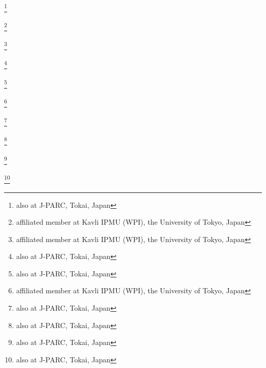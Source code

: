 \documentclass[%
 reprint,
superscriptaddress,
 amsmath,amssymb,
 aps,
]{revtex4-1}
\begin{document}
\author{T.\,Kutter}\INSTFI
\author{J.\,Lagoda}\INSTDF
\author{I.\,Lamont}\INSTEJ
\author{E.\,Larkin}\INSTFD
\author{M.\,Laveder}\INSTBF
\author{M.\,Lawe}\INSTEJ
\author{M.\,Lazos}\INSTFC
\author{T.\,Lindner}\INSTB
\author{C.\,Lister}\INSTFD
\author{R.P.\,Litchfield}\INSTFD
\author{A.\,Longhin}\INSTBF
\author{J.P.\,Lopez}\INSTGB
\author{L.\,Ludovici}\INSTBD
\author{L.\,Magaletti}\INSTGF
\author{K.\,Mahn}\INSTHB
\author{M.\,Malek}\INSTEI
\author{S.\,Manly}\INSTGD
\author{A.D.\,Marino}\INSTGB
\author{J.\,Marteau}\INSTJ
\author{J.F.\,Martin}\INSTF
\author{P.\,Martins}\INSTFA
\author{S.\,Martynenko}\INSTEB
\author{T.\,Maruyama}\thanks{also at J-PARC, Tokai, Japan}\INSTCB
\author{V.\,Matveev}\INSTEB
\author{K.\,Mavrokoridis}\INSTFC
\author{E.\,Mazzucato}\INSTI
\author{M.\,McCarthy}\INSTH
\author{N.\,McCauley}\INSTFC
\author{K.S.\,McFarland}\INSTGD
\author{C.\,McGrew}\INSTFJ
\author{A.\,Mefodiev}\INSTEB
\author{C.\,Metelko}\INSTFC
\author{M.\,Mezzetto}\INSTBF
\author{P.\,Mijakowski}\INSTDF
\author{C.A.\,Miller}\INSTB
\author{A.\,Minamino}\INSTCD
\author{O.\,Mineev}\INSTEB
\author{A.\,Missert}\INSTGB
\author{M.\,Miura}\thanks{affiliated member at Kavli IPMU (WPI), the University of Tokyo, Japan}\INSTBJ
\author{S.\,Moriyama}\thanks{affiliated member at Kavli IPMU (WPI), the University of Tokyo, Japan}\INSTBJ
\author{Th.A.\,Mueller}\INSTBA
\author{A.\,Murakami}\INSTCD
\author{M.\,Murdoch}\INSTFC
\author{S.\,Murphy}\INSTEF
\author{J.\,Myslik}\INSTG
\author{T.\,Nakadaira}\thanks{also at J-PARC, Tokai, Japan}\INSTCB
\author{M.\,Nakahata}\INSTBJ\INSTHA
\author{K.G.\,Nakamura}\INSTCD
\author{K.\,Nakamura}\thanks{also at J-PARC, Tokai, Japan}\INSTHA\INSTCB
\author{S.\,Nakayama}\thanks{affiliated member at Kavli IPMU (WPI), the University of Tokyo, Japan}\INSTBJ
\author{T.\,Nakaya}\INSTCD\INSTHA
\author{K.\,Nakayoshi}\thanks{also at J-PARC, Tokai, Japan}\INSTCB
\author{C.\,Nantais}\INSTD
\author{C.\,Nielsen}\INSTD
\author{M.\,Nirkko}\INSTEE
\author{K.\,Nishikawa}\thanks{also at J-PARC, Tokai, Japan}\INSTCB
\author{Y.\,Nishimura}\INSTCG
\author{J.\,Nowak}\INSTEJ
\author{H.M.\,O'Keeffe}\INSTEJ
\author{R.\,Ohta}\thanks{also at J-PARC, Tokai, Japan}\INSTCB
\author{K.\,Okumura}\INSTCG\INSTHA
\author{T.\,Okusawa}\INSTCF
\author{W.\,Oryszczak}\INSTDJ
\author{S.M.\,Oser}\INSTD
\author{T.\,Ovsyannikova}\INSTEB
\author{R.A.\,Owen}\INSTFA
\author{Y.\,Oyama}\thanks{also at J-PARC, Tokai, Japan}\INSTCB
\author{V.\,Palladino}\INSTBE
\author{J.L.\,Palomino}\INSTFJ
\author{V.\,Paolone}\INSTGC
\author{D.\,Payne}\INSTFC
\author{O.\,Perevozchikov}\INSTFI
\author{J.D.\,Perkin}\INSTFB
\author{Y.\,Petrov}\INSTD
\end{document}
